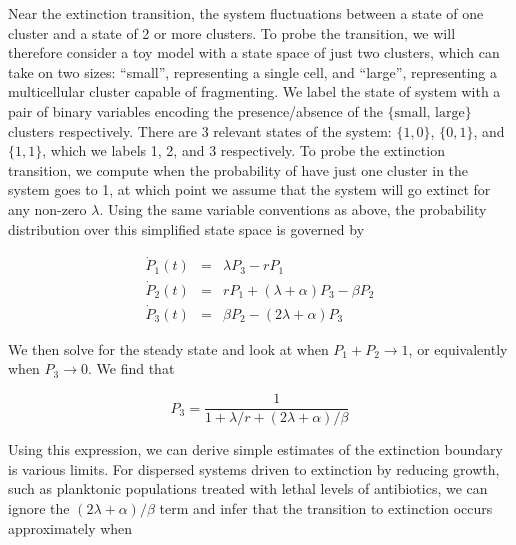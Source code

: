 \documentclass[12pt]{article}
\def\be{\begin{equation}}
\def\ee{\end{equation}}
\def\bea{\begin{eqnarray}}
\def\eea{\end{eqnarray}}
\begin{document}


Near the extinction transition, the system fluctuations between a state of one cluster and a state of 2 or more clusters. To probe the transition, we will therefore consider a toy model with a state space of just two clusters, which can take on two sizes: ``small'', representing a single cell, and ``large'', representing a multicellular cluster capable of fragmenting. We label the state of system with a pair of binary variables encoding the presence/absence of the $\{\text{small, }\text{large}\}$ clusters respectively. There are 3 relevant states of the system: $\{1,0\}$, $\{0,1\}$, and $\{1,1\}$, which we labels 1, 2, and 3 respectively. To probe the extinction transition, we compute when the probability of have just one cluster in the system goes to 1, at which point we assume that the system will go extinct for any non-zero $\lambda$. Using the same variable conventions as above, the probability distribution over this simplified state space is governed by

\bea
	\dot{P}_1(t) &=& \lambda P_3 - rP_1\\
	\dot{P}_2(t) &=& rP_1 + (\lambda + \alpha)P_3 - \beta P_2\\
	\dot{P}_3(t) &=& \beta P_2 - (2\lambda + \alpha) P_3
\eea

\noindent We then solve for the steady state and look at when $P_1 + P_2 \to 1$, or equivalently when $P_3 \to 0$. We find that

\be
	P_3 = \frac{1}{1+\lambda/r + (2\lambda+\alpha)/\beta} 
\ee

\noindent Using this expression, we can derive simple estimates of the extinction boundary is various limits. For dispersed systems driven to extinction by reducing growth, such as planktonic populations treated with lethal levels of antibiotics, we can ignore the $(2\lambda + \alpha)/\beta$ term and infer that the transition to extinction occurs approximately when
\end{document}
